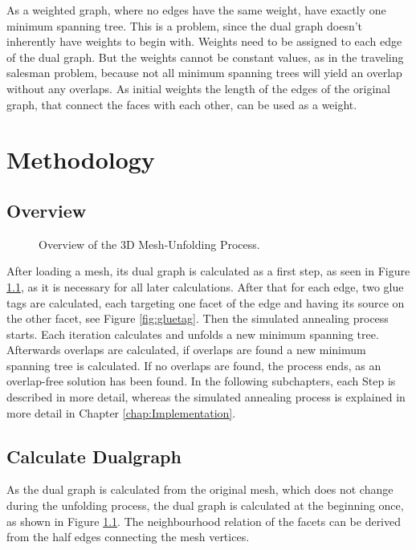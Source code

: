 \documentclass[draft,final]{vutinfth} %
\begin{document}
As a weighted graph, where no edges have the same weight, have exactly one minimum spanning tree. This is a problem, since the dual graph doesn't inherently have weights to begin with. Weights need to be assigned to each edge of the dual graph. But the weights cannot be constant values, as in the traveling salesman problem, because not all minimum spanning trees will yield an overlap without any overlaps. 
As initial weights the length of the edges of the original graph, that connect the faces with each other, can be used as a weight.

\chapter{Methodology}
\label{chap:methodology}

\section{Overview}

\begin{figure}

\caption{Overview of the 3D Mesh-Unfolding Process.}
\label{fig:overview}
\end{figure}

After loading a mesh, its dual graph is calculated as a first step, as seen in Figure \ref{fig:overview}, as it is necessary for all later calculations. After that for each edge, two glue tags are calculated, each targeting one facet of the edge and having its source on the other facet, see Figure \ref{fig:gluetag}. Then the simulated annealing process starts. Each iteration calculates and unfolds a new minimum spanning tree. Afterwards overlaps are calculated, if overlaps are found a new minimum spanning tree is calculated. If no overlaps are found, the process ends, as an overlap-free solution has been found. In the following subchapters, each Step is described in more detail, whereas the simulated annealing process is explained in more detail in Chapter \ref{chap:Implementation}.

\section{Calculate Dualgraph}

As the dual graph is calculated from the original mesh, which does not change during the unfolding process, the dual graph is calculated at the beginning once, as shown in Figure \ref{fig:overview}. The neighbourhood relation of the facets can be derived from the half edges connecting the mesh vertices. 
\end{document}
